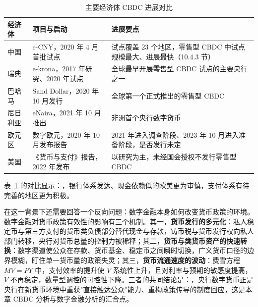 \begin{table}[htbp]
\centering
\setlength{\tabcolsep}{4pt}
\caption{主要经济体 CBDC 进展对比}
\label{tab:cbdc}
\begin{tabular}{p{2.2cm}p{3.4cm}p{5.4cm}}
\hline
\textbf{经济体} & \textbf{项目与启动} & \textbf{进展要点} \\
\hline
中国 & e-CNY，2020 年 4 月首批试点 & 试点覆盖 23 个地区，零售型 CBDC 中试点规模最大、进展最快（10.4.3 节） \\
\hline
瑞典 & e-krona，2017 年研究、2020 年试点 & 全球最早开展零售型 CBDC 试点的主要央行之一 \\
\hline
巴哈马 & Sand Dollar，2020 年 10 月发行 & 全球第一个正式推出的零售型 CBDC \\
\hline
尼日利亚 & eNaira，2021 年 10 月推出 & 非洲首个央行数字货币 \\
\hline
欧元区 & 数字欧元，2020 年 10 月发布报告 & 2021 年进入调查阶段、2023 年 10 月进入准备阶段，是否发行未定 \\
\hline
美国 & 《货币与支付》报告，2022 年发布 & 以研究为主，未经国会授权不发行零售型 CBDC \\
\hline
\end{tabular}
\end{table}

表~\ref{tab:cbdc} 的对比显示：，银行体系发达、现金依赖低的欧美更为审慎，支付体系有待完善的地区更为积极。

在这一背景下还需要回答一个反向问题：数字金融本身如何改变货币政策的环境。数字金融对货币政策有效性的影响有三个机制。其一，\textbf{货币发行的多元化}：私人稳定币与第三方支付的货币类负债部分替代现金与存款，铸币税与货币发行权向私人部门转移，央行对货币总量的控制力被稀释；其二，\textbf{货币与类货币资产的快速转换}：数字渠道使公众在存款、货币基金、稳定币之间瞬时切换，广义货币口径的边界模糊，盯住单一货币量的政策失灵；其三，\textbf{货币流通速度的波动}：费雪方程 $MV = PY$ 中，支付效率的提升使 $V$ 系统性上升，且对利率与预期的敏感度提高，$V$ 不再稳定，数量型调控的可控性下降。三者的共同结论是：，央行数字货币正是央行在新货币环境中重获"直接触达公众"能力、重构政策传导的制度回应，这是本章 CBDC 分析与数字金融分析的汇合点。


